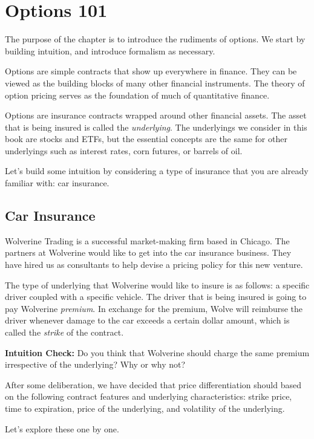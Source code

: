 \documentclass[11pt,]{krantz}
\begin{document}
\chapter{Options 101}\label{options-101}

The purpose of the chapter is to introduce the rudiments of options. We start by building intuition, and introduce formalism as necessary.

Options are simple contracts that show up everywhere in finance. They can be viewed as the building blocks of many other financial instruments. The theory of option pricing serves as the foundation of much of quantitative finance.

Options are insurance contracts wrapped around other financial assets. The asset that is being insured is called the \emph{underlying}. The underlyings we consider in this book are stocks and ETFs, but the essential concepts are the same for other underlyings such as interest rates, corn futures, or barrels of oil.

Let's build some intuition by considering a type of insurance that you are already familiar with: car insurance.

\section{Car Insurance}\label{car-insurance}

Wolverine Trading is a successful market-making firm based in Chicago. The partners at Wolverine would like to get into the car insurance business. They have hired us as consultants to help devise a pricing policy for this new venture.

The type of underlying that Wolverine would like to insure is as follows: a specific driver coupled with a specific vehicle. The driver that is being insured is going to pay Wolverine \emph{premium}. In exchange for the premium, Wolve will reimburse the driver whenever damage to the car exceeds a certain dollar amount, which is called the \emph{strike} of the contract.

\textbf{Intuition Check:} Do you think that Wolverine should charge the same premium irrespective of the underlying? Why or why not?

After some deliberation, we have decided that price differentiation should based on the following contract features and underlying characteristics: strike price, time to expiration, price of the underlying, and volatility of the underlying.

Let's explore these one by one.
\end{document}
